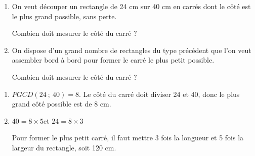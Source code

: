 \documentclass{cornouaille}
\begin{document}
\begin{exercice}
\begin{enumerate}
\item On veut découper un rectangle de 24 cm sur 40 cm en carrés dont le côté est le plus grand possible, sans perte.

Combien doit mesurer le côté du carré ?

\item On dispose d'un grand nombre de rectangles du type précédent que
  l'on veut assembler bord à bord pour former le carré le plus petit possible.

Combien doit mesurer le côté du carré ?
\end{enumerate}
\end{exercice}
\begin{solution}
  \begin{enumerate}
  \item$PGCD(24\ ;\ 40)=8$. Le côté du carré doit diviser 24 et 40, donc
    le plus grand côté possible est de 8 cm.

  \item $40=8\times5$\enskip et \enskip $24=8\times3$

  Pour former le plus petit carré, il faut mettre 3 fois la longueur
  et 5 fois la largeur du rectangle, soit 120 cm.
\end{enumerate}
\end{solution}
\end{document}
